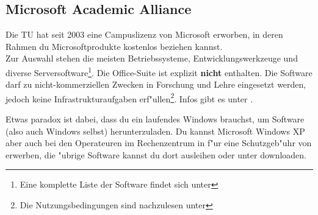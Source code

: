 \subsection{Microsoft Academic Alliance}
\label{msdnaa}
Die TU hat seit 2003 eine
Campuslizenz
von Microsoft erworben, in deren Rahmen du Microsoftprodukte kostenlos
beziehen kannst.\\
Zur Auswahl stehen die meisten Betriebssysteme, Entwicklungswerkzeuge und
diverse Serversoftware\footnote{\sloppy Eine komplette Liste der Software
findet sich unter }.
Die Office-Suite ist explizit \textbf{nicht} enthalten.
Die Software darf zu nicht-kommerziellen Zwecken in Forschung und Lehre
eingesetzt werden, jedoch keine Infrastrukturaufgaben
erf"ullen\footnote{Die Nutzungsbedingungen sind nachzulesen unter
}.
Infos gibt es unter
.


Etwas paradox ist dabei, dass du ein laufendes Windows brauchst, um Software 
(also auch Windows selbst) herunterzuladen. Du kannst Microsoft Windows XP 
aber auch bei den Operateuren im Rechenzentrum in 
f"ur eine Schutzgeb"uhr von  erwerben, die "ubrige Software kannst du
dort ausleihen oder unter
downloaden.